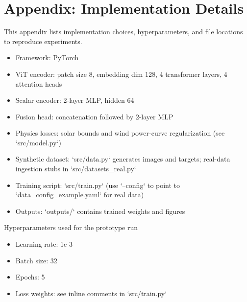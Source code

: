\section*{Appendix: Implementation Details}

This appendix lists implementation choices, hyperparameters, and file locations to reproduce experiments.

\begin{itemize}
  \item Framework: PyTorch
  \item ViT encoder: patch size 8, embedding dim 128, 4 transformer layers, 4 attention heads
  \item Scalar encoder: 2-layer MLP, hidden 64
  \item Fusion head: concatenation followed by 2-layer MLP
  \item Physics losses: solar bounds and wind power-curve regularization (see `src/model.py`)
  \item Synthetic dataset: `src/data.py` generates images and targets; real-data ingestion stubs in `src/datasets_real.py`
  \item Training script: `src/train.py` (use `--config` to point to `data_config_example.yaml` for real data)
  \item Outputs: `outputs/` contains trained weights and figures
\end{itemize}

Hyperparameters used for the prototype run
\begin{itemize}
  \item Learning rate: 1e-3
  \item Batch size: 32
  \item Epochs: 5
  \item Loss weights: see inline comments in `src/train.py`
\end{itemize}
